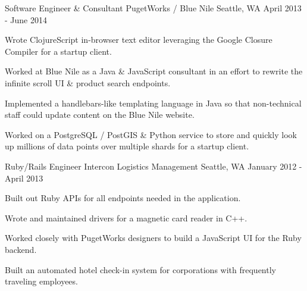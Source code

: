 \begin{cventries}
  \cventry
    {Software Engineer \& Consultant} %
    {PugetWorks / Blue Nile} %
    {Seattle, WA} %
    {April 2013 - June 2014} %
    {
      \begin{cvitems} %
        \item {Wrote ClojureScript in-browser text editor leveraging the Google Closure Compiler for a startup client.}
        \item {Worked at Blue Nile as a Java \& JavaScript consultant in an effort to rewrite the infinite scroll UI \& product search endpoints.}
        \item {Implemented a handlebars-like templating language in Java so that non-technical staff could update content on the Blue Nile website.}
        \item {Worked on a PostgreSQL / PostGIS \& Python service to store and quickly look up millions of data points over multiple shards for a startup client.}
      \end{cvitems}
    }

  \cventry
    {Ruby/Rails Engineer} %
    {Intercon Logistics Management} %
    {Seattle, WA} %
    {January 2012 - April 2013} %
    {
      \begin{cvitems} %
        \item {Built out Ruby APIs for all endpoints needed in the application.}
        \item {Wrote and maintained drivers for a magnetic card reader in C++.}
        \item {Worked closely with PugetWorks designers to build a JavaScript UI for the Ruby backend.}
        \item {Built an automated hotel check-in system for corporations with frequently traveling employees.}
      \end{cvitems}
    }

\end{cventries}
